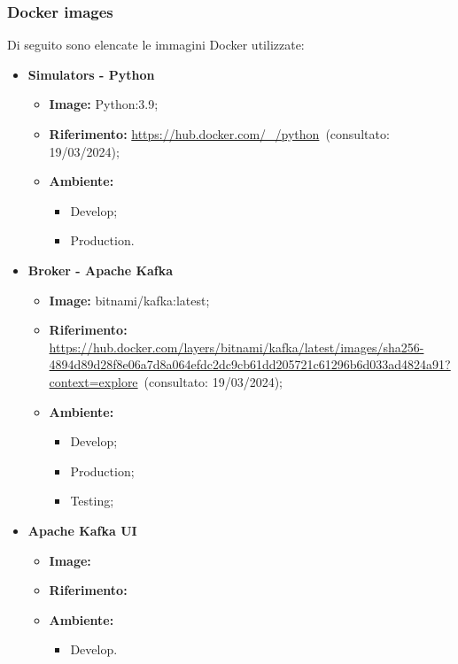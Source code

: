 \subsubsection{Docker images}

Di seguito sono elencate le immagini Docker utilizzate:

\begin{itemize}

  \item \textbf{Simulators - Python} 
    \begin{itemize}
      \item \textbf{Image:} Python:3.9;
      \item \textbf{Riferimento:} \url{https://hub.docker.com/_/python}~(consultato: 19/03/2024);
      \item \textbf{Ambiente:}
        \begin{itemize}
          \item Develop;
          \item Production.
        \end{itemize}
    \end{itemize}

  \item \textbf{Broker - Apache Kafka} 
    \begin{itemize}
      \item \textbf{Image:} bitnami/kafka:latest;
      \item \textbf{Riferimento:} \url{https://hub.docker.com/layers/bitnami/kafka/latest/images/sha256-4894d89d28f8e06a7d8a064efdc2dc9cb61dd205721c61296b6d033ad4824a91?context=explore}~(consultato: 19/03/2024);
      \item \textbf{Ambiente:}
        \begin{itemize}
          \item Develop;
          \item Production;
          \item Testing;
        \end{itemize}
    \end{itemize}

  \item \textbf{Apache Kafka UI} 
    \begin{itemize}
      \item \textbf{Image:}
      \item \textbf{Riferimento:}
      \item \textbf{Ambiente:}
        \begin{itemize}
          \item Develop.
        \end{itemize}
    \end{itemize}


\end{itemize}
